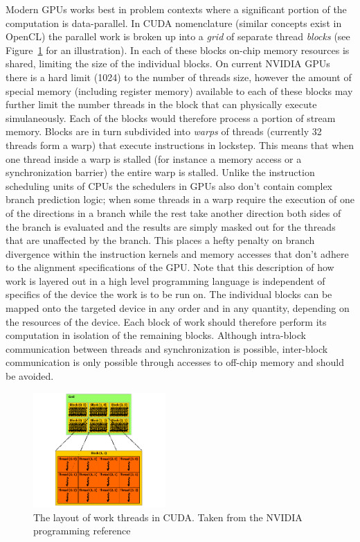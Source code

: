 Modern GPUs works best in problem contexts where a significant portion of the computation is data-parallel. In CUDA nomenclature (similar concepts exist in OpenCL) the parallel work is broken up into a \textit{grid} of
separate thread \textit{blocks} (see Figure~\ref{fig_grid_blocks} for an illustration). In each of these blocks on-chip memory resources is shared, limiting the size of the individual blocks. On current NVIDIA GPUs there is a hard limit (1024) to the number of threads size, 
however the amount of special memory (including register memory) available to each of these blocks may further limit the number threads in the block that can physically execute simulaneously. Each of the 
blocks would therefore process a portion of stream memory. Blocks are in turn subdivided into \textit{warps} of threads (currently 32 threads form a warp) that execute instructions in lockstep. This means that when one
thread inside a warp is stalled (for instance a memory access or a synchronization barrier) the entire warp is stalled. Unlike the instruction scheduling units of CPUs the schedulers in GPUs also don't contain complex branch prediction logic; when some
threads in a warp require the execution of one of the directions in a branch while the rest take another direction both sides of the branch is evaluated and the results are simply masked out for the threads that are unaffected
by the branch. This places a hefty penalty on branch divergence within the instruction kernels and memory accesses that don't adhere to the alignment specifications of the GPU. Note that this description of how work is layered out in a high level programming language is independent of specifics of the device the work is to be run on. 
The individual blocks can be mapped onto the targeted device in any order and in any quantity, depending on the resources of the device. Each block of work should therefore perform its computation in isolation of the remaining blocks. Although intra-block communication between threads 
and synchronization is possible, inter-block communication is only possible through accesses to off-chip memory and should be avoided.
\begin{figure}[ht!]
 \begin{mdframed}
  \centering
  \includegraphics[width=0.45\textwidth]{images/grid-of-thread-blocks.png}
  \caption[Thread layout in CUDA]{The layout of work threads in CUDA. Taken from the NVIDIA programming reference \cite{cuda}}
  \label{fig_grid_blocks}
 \end{mdframed}
\end{figure}

